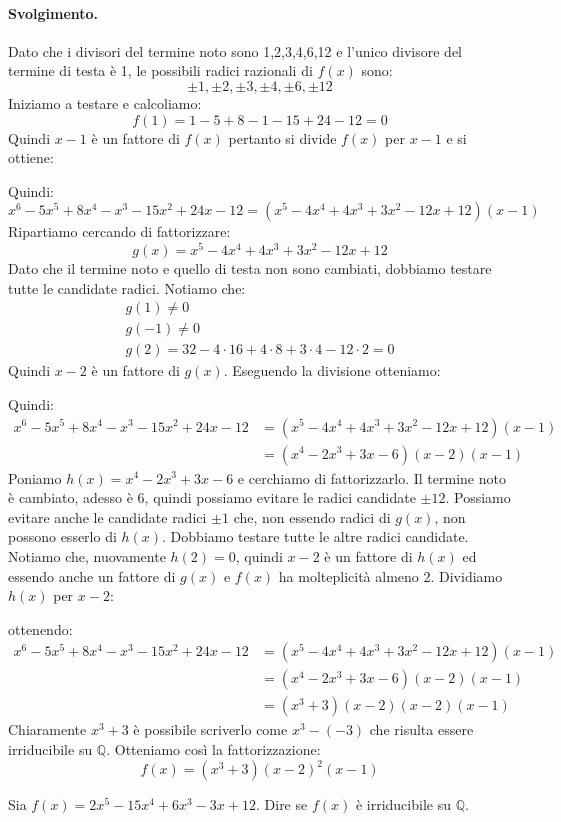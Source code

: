 \paragraph{Svolgimento.} Dato che i divisori del termine noto sono 1,2,3,4,6,12 e l'unico divisore del termine di testa è 1, le possibili radici razionali di $f(x)$ sono:
\[\pm 1, \pm 2, \pm 3, \pm 4, \pm 6, \pm12\]
Iniziamo a testare e calcoliamo:
\[f(1)=1-5+8-1-15+24-12=0\]
Quindi $x-1$ è un fattore di $f(x)$ pertanto si divide $f(x)$ per $x-1$ e si ottiene:
\begin{center}
\end{center}
Quindi:
\[x^{6}-5x^{5}+8x^{4}-x^{3}-15x^{2}+24x-12 = (x^{5}-4x^{4}+4x^{3}+3x^{2}-12x+12)(x-1)\]
Ripartiamo cercando di fattorizzare:
\[g(x)=x^{5}-4x^{4}+4x^{3}+3x^{2}-12x+12\]
Dato che il termine noto e quello di testa non sono cambiati, dobbiamo testare tutte le candidate radici. Notiamo che:
\begin{align*}
	g(1) \neq 0 \\
	g(-1) \neq 0 \\
	g(2) = 32-4 \cdot 16 + 4 \cdot 8 +3 \cdot 4 -12 \cdot 2 = 0
\end{align*}
Quindi $x-2$ è un fattore di $g(x)$. Eseguendo la divisione otteniamo:
\begin{center}
\end{center}
Quindi:
\begin{align*}
	x^{6}-5x^{5}+8x^{4}-x^{3}-15x^{2}+24x-12 &= (x^{5}-4x^{4}+4x^{3}+3x^{2}-12x+12)(x-1) \\
	&= (x^{4}-2x^{3}+3x-6)(x-2)(x-1)
\end{align*}
Poniamo $h(x)=x^{4}-2x^{3}+3x-6$ e cerchiamo di fattorizzarlo. Il termine noto è cambiato, adesso è 6, quindi possiamo evitare le radici candidate $\pm 12$. Possiamo evitare anche le candidate radici $\pm 1$ che, non essendo radici di $g(x)$, non possono esserlo di $h(x)$. Dobbiamo testare tutte le altre radici candidate. Notiamo che, nuovamente $h(2)=0$, quindi $x-2$ è un fattore di $h(x)$ ed essendo anche un fattore di $g(x)$ e $f(x)$ ha molteplicità almeno 2. Dividiamo $h(x)$ per $x-2$:
\begin{center}
\end{center}
ottenendo:
\begin{align*}
	x^{6}-5x^{5}+8x^{4}-x^{3}-15x^{2}+24x-12 &= (x^{5}-4x^{4}+4x^{3}+3x^{2}-12x+12)(x-1) \\
	&= (x^{4}-2x^{3}+3x-6)(x-2)(x-1) \\
	&= (x^{3}+3)(x-2)(x-2)(x-1)
\end{align*}
Chiaramente $x^{3}+3$ è possibile scriverlo come $x^{3}-(-3)$ che risulta essere irriducibile su $\mathbb{Q}$. Otteniamo così la fattorizzazione:
\[f(x)=(x^{3}+3)(x-2)^{2}(x-1)\]
\hfill \blacksquare
\begin{exsbox}
	Sia $f(x)=2x^{5}-15x^{4}+6x^{3}-3x+12$. Dire se $f(x)$ è irriducibile su $\mathbb{Q}$.
\end{exsbox}

